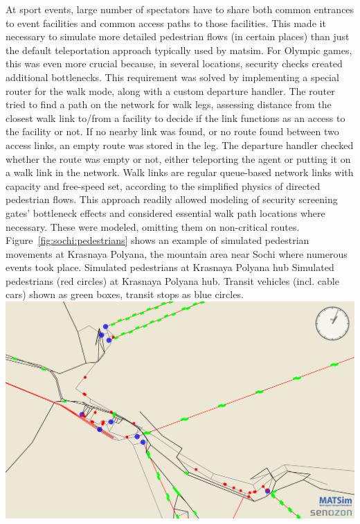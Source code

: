At sport events, large number of spectators have to share both common entrances
to event facilities and common access paths to those facilities. This
made it necessary to simulate more detailed pedestrian flows (in certain places) 
than just the default \gls{teleportation} approach typically used by
\gls{matsim}. For Olympic games, this was even more crucial because,
in several locations, security checks created additional
bottlenecks. This requirement was solved by implementing a special router for
the walk mode, along with a custom departure handler. The router tried to find a
path on the network for walk legs, assessing distance from the closest walk
link to/from a facility to decide if the link functions as an access to the
facility or not. If no nearby link was found, or no route found between
two access links, an empty route was stored in the leg. The departure handler
checked whether the route was empty or not, either teleporting the agent or putting it
on a walk link in the network. Walk links are regular queue-based network links
with capacity and free-speed set, according to the simplified physics of
directed pedestrian flows. This approach readily allowed modeling of security
screening gates' bottleneck effects and considered essential
walk path locations where necessary. These were modeled, omitting them
on non-critical routes. Figure~\ref{fig:sochi:pedestrians}
shows an example of simulated pedestrian movements at Krasnaya Polyana, the
mountain area near Sochi where numerous events took place.  
%
\createfigure%
{Simulated pedestrians at Krasnaya Polyana hub}%
{Simulated pedestrians (red circles) at Krasnaya Polyana hub. Transit vehicles
(incl. cable cars) shown as green boxes, transit stops as blue circles.}%
{\label{fig:sochi:pedestrians}}%
{\includegraphics[width=1.\textwidth,angle=0]{./using/figures/sochi_pedestrians.pdf}}%
{}
%

